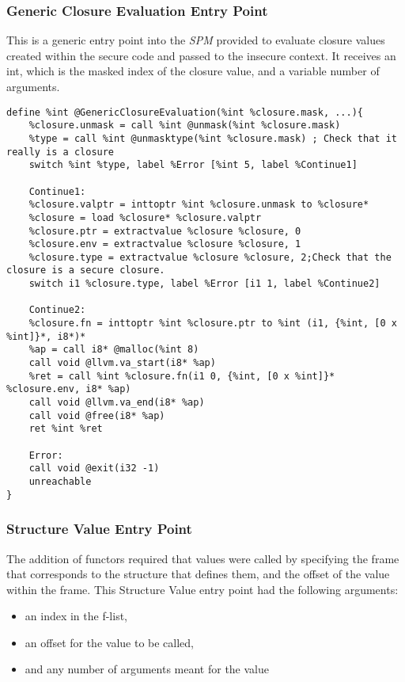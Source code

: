 \subsubsection{Generic Closure Evaluation Entry Point}
\label{sec:genericclosureevaluationentrypoint}
This is a generic entry point into the \emph{SPM} provided to evaluate closure values created within the secure code and passed to the insecure context. It receives an int, which is the masked index of the closure value, and a variable number of arguments.

\begin{lstlisting}
define %int @GenericClosureEvaluation(%int %closure.mask, ...){
    %closure.unmask = call %int @unmask(%int %closure.mask)
    %type = call %int @unmasktype(%int %closure.mask) ; Check that it really is a closure
    switch %int %type, label %Error [%int 5, label %Continue1]
    
    Continue1:
    %closure.valptr = inttoptr %int %closure.unmask to %closure*
    %closure = load %closure* %closure.valptr
    %closure.ptr = extractvalue %closure %closure, 0
    %closure.env = extractvalue %closure %closure, 1
    %closure.type = extractvalue %closure %closure, 2;Check that the closure is a secure closure.
    switch i1 %closure.type, label %Error [i1 1, label %Continue2]
    
    Continue2:
    %closure.fn = inttoptr %int %closure.ptr to %int (i1, {%int, [0 x %int]}*, i8*)*
    %ap = call i8* @malloc(%int 8)
    call void @llvm.va_start(i8* %ap)
    %ret = call %int %closure.fn(i1 0, {%int, [0 x %int]}* %closure.env, i8* %ap)
    call void @llvm.va_end(i8* %ap)
    call void @free(i8* %ap)
    ret %int %ret
    
    Error:
    call void @exit(i32 -1)
    unreachable
}
\end{lstlisting}

\subsubsection{Structure Value Entry Point}
The addition of functors required that values were called by specifying the frame that corresponds to the structure that defines them, and the offset of the value within the frame.
This Structure Value entry point had the following arguments:
\begin{itemize}
\item an index in the f-list,
\item an offset for the value to be called,
\item and any number of arguments meant for the value 
\end{itemize}

